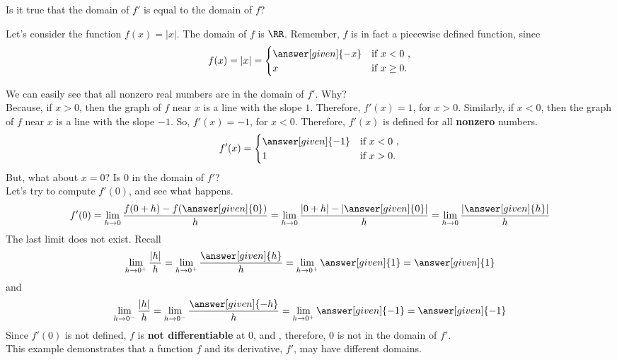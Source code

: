 \documentclass{ximera}
\begin{document}
\begin{question}
Is it true that the domain of $f'$ is equal to the domain of $f$?
  \begin{multipleChoice}
  \end{multipleChoice}
  \begin{feedback}
   Let's consider the function $f(x)=|x|$. The domain of $f$ is  $\RR$.
   Remember, $f$ is in fact a piecewise defined function, since
    \[
f(x)=|x| = 
\begin{cases}
\answer[given]{ -x} &\text{if $x<0$ ,}\\
  x &\text{if $x\geq 0$}.
\end{cases}
\]

   We can easily see that all nonzero real numbers are in the domain of $f'$. Why?\\
   Because, if $x>0$, then the graph of $f$ near $x$ is a line with the slope $1$. Therefore,  $f'(x)=1$, for $x>0$.  
   Similarly, if $x<0$, then the graph of $f$ near $x$ is a line with the slope $-1$. So, $f'(x)=-1$,  for $x<0$.
  Therefore, $f'(x)$ is defined for all \textbf{nonzero} numbers. 
   \[
f'(x) = 
\begin{cases}
\answer[given]{ -1} &\text{if $x<0$ ,}\\
  1 &\text{if $x> 0$}.
\end{cases}
\]
But, what about $x=0$? Is 0 in the domain of $f'$?\\
Let's try to compute $f'(0)$, and see what happens.
\[
		f'(0)=  \lim_{h\to 0} \dfrac{f(0+h) - f(\answer[given]{0})}{h}= \lim_{h\to 0} \dfrac{|0+h|-|\answer[given]{0}| }{h}
		= \lim_{h\to 0} \dfrac{|\answer[given]{h}| }{h}
		\]
		The last limit does not exist. Recall
		\[
				 \lim_{h\to 0^+} \dfrac{|h| }{h}= \lim_{h\to 0^+} \dfrac{\answer[given]{h} }{h}=\lim_{h\to 0^+} \answer[given]{1}=\answer[given]{1}
		\]
		and 
		\[
				 \lim_{h\to 0^-} \dfrac{|h| }{h}= \lim_{h\to 0^-} \dfrac{\answer[given]{-h} }{h}=\lim_{h\to 0^+} \answer[given]{-1}=\answer[given]{-1}
		\]
	Since $f'(0)$ is not defined, $f$ is \textbf{not differentiable} at $0$, and , therefore,  $0$ is not in the domain of $f'$.\\
	This example demonstrates that a function $f$ and its derivative, $f'$, may have different domains.
  \end{feedback}
\end{question}
\end{document}

